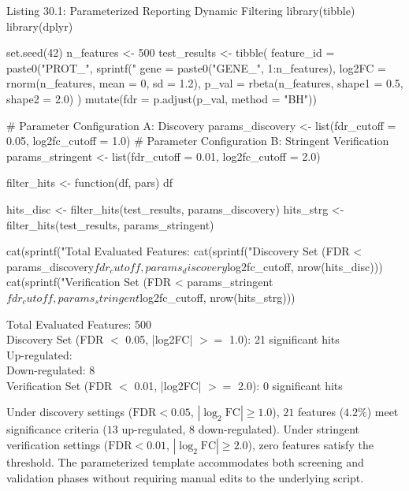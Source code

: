 \documentclass[11pt,twoside,openright]{book}
\begin{document}
\begin{rchunk}{Listing 30.1: Parameterized Reporting Dynamic Filtering}
library(tibble)
library(dplyr)

set.seed(42)
n_features <- 500
test_results <- tibble(
  feature_id = paste0("PROT_", sprintf("%
  gene       = paste0("GENE_", 1:n_features),
  log2FC     = rnorm(n_features, mean = 0, sd = 1.2),
  p_val      = rbeta(n_features, shape1 = 0.5, shape2 = 2.0)
) %
  mutate(fdr = p.adjust(p_val, method = "BH"))

# Parameter Configuration A: Discovery
params_discovery <- list(fdr_cutoff = 0.05, log2fc_cutoff = 1.0)
# Parameter Configuration B: Stringent Verification
params_stringent <- list(fdr_cutoff = 0.01, log2fc_cutoff = 2.0)

filter_hits <- function(df, pars) {
  df %
}

hits_disc <- filter_hits(test_results, params_discovery)
hits_strg <- filter_hits(test_results, params_stringent)

cat(sprintf("Total Evaluated Features: %
cat(sprintf("Discovery Set (FDR < %
            params_discovery$fdr_cutoff, params_discovery$log2fc_cutoff, nrow(hits_disc)))
cat(sprintf("Verification Set (FDR < %
            params_stringent$fdr_cutoff, params_stringent$log2fc_cutoff, nrow(hits_strg)))
\end{rchunk}

\begin{routput}
Total Evaluated Features: 500\\
Discovery Set (FDR $<$ 0.05, |log2FC| $>=$ 1.0): 21 significant hits\\
\enspace\enspace Up-regulated:\enspace{}\\
\enspace\enspace Down-regulated: 8\\[0.4em]
Verification Set (FDR $<$ 0.01, |log2FC| $>=$ 2.0): 0 significant hits
\end{routput}

Under discovery settings ($\text{FDR} < 0.05$, $|\log_2\text{FC}| \ge 1.0$), $21$ features ($4.2\%$) meet significance criteria ($13$ up-regulated, $8$ down-regulated). Under stringent verification settings ($\text{FDR} < 0.01$, $|\log_2\text{FC}| \ge 2.0$), zero features satisfy the threshold. The parameterized template accommodates both screening and validation phases without requiring manual edits to the underlying script.
\end{document}
